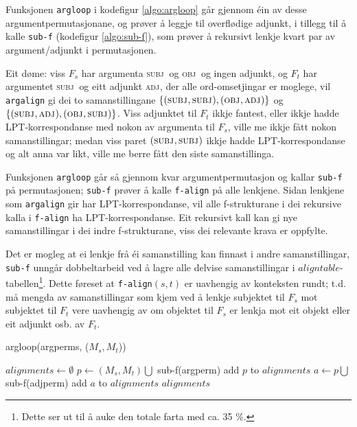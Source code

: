 \documentclass[11pt,a4paper,oneside,draft]{book}
\newcommand{\F}[2]{\textsc{#1}\ensuremath{_{#2}}}
\newcommand{\OBJ}{\F{obj}{}}
\newcommand{\OBJs}{\F{obj~}{}}
\newcommand{\ADJ}{\F{adj}{}}
\newcommand{\SUBJ}{\F{subj}{}}
\newcommand{\SUBJs}{\F{subj~}{}}
\begin{document}
 Funksjonen \texttt{argloop} i kodefigur \ref{algo:argloop} går gjennom éin
 av desse argumentpermutasjonane, og prøver å leggje til overflødige
 adjunkt, i tillegg til å kalle \texttt{sub-f} (kodefigur \ref{algo:sub-f}),
 som prøver å rekursivt lenkje kvart par av argument/adjunkt i
 permutasjonen.

 Eit døme: viss $F_s$ har argumenta \SUBJs og \OBJs og ingen adjunkt,
 og $F_t$ har argumentet \SUBJs og eitt adjunkt \ADJ, der alle
 ord-omsetjingar er moglege, vil \texttt{argalign} gi dei to samanstillingane
 $\{(\SUBJ,\SUBJ), (\OBJ,\ADJ)\}$ og $\{(\SUBJ,\ADJ),
 (\OBJ,\SUBJ)\}$. Viss adjunktet til $F_t$ ikkje fantest, eller ikkje
 hadde LPT-korrespondanse med nokon av argumenta til $F_s$, ville me
 ikkje fått nokon samanstillingar; medan viss paret $(\SUBJ,\SUBJ)$
 ikkje hadde LPT-korrespondanse og alt anna var likt, ville me berre
 fått den siste samanstillinga.

 Funksjonen \texttt{argloop} går så gjennom kvar argumentpermutasjon og
 kallar \texttt{sub-f} på permutasjonen; \texttt{sub-f} prøver å kalle \texttt{f-align} på
 alle lenkjene. Sidan lenkjene som \texttt{argalign} gir har
 LPT-korrespondanse, vil alle f-strukturane i dei rekursive kalla i
 \texttt{f-align} ha LPT-korrespondanse. Eit rekursivt kall kan gi nye
 samanstillingar i dei indre f-strukturane, viss dei relevante krava
 er oppfylte.

 Det er mogleg at ei lenkje frå éi samanstilling kan finnast i andre
 samanstillingar, \texttt{sub-f} unngår dobbeltarbeid ved å lagre alle
 delvise samanstillingar i $aligntable$-tabellen\footnote{Dette ser ut til å auke den totale farta med ca. 35 \%. }. Dette føreset
 at \texttt{f-align}$(s,t)$ er uavhengig av konteksten rundt; t.d. må
 mengda av samanstillingar som kjem ved å lenkje subjektet til $F_s$
 mot subjektet til $F_t$ vere uavhengig av om objektet til $F_s$ er
 lenkja mot eit objekt eller eit adjunkt osb. av $F_t$.

  \begin{algorithm}[]
    \caption{argloop(argperms, ($M_s,M_t$))}
    \label{algo:argloop}

    $alignments \gets \emptyset$  \;
     {
       {
        $p \gets (M_s,M_t) \bigcup$ sub-f(argperm)
        add $p$ to $alignments$ \;
         {
          $a \gets p \bigcup$ sub-f(adjperm)  
          add $a$ to $alignments$\;
        } %
      } %
    }
    \Return $alignments$
  \end{algorithm}    
  
\end{document}

